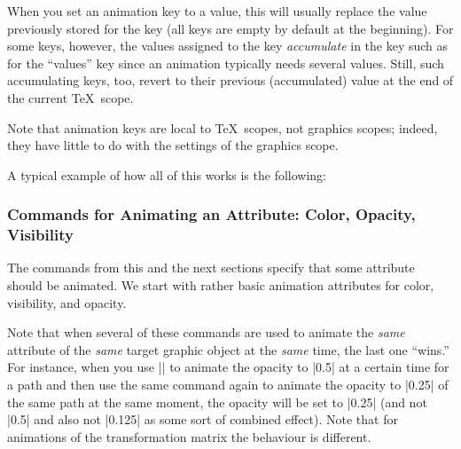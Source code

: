 \begin{enumerate}
  When you set an animation key to a value, this will usually replace
  the value previously stored for the key (all keys are empty by
  default at the beginning). For some keys, however, the values
  assigned to the key \emph{accumulate} in the key such as for the
  ``values'' key since an animation typically needs several
  values. Still, such accumulating keys, too, revert to their previous
  (accumulated) value at the end of the current \TeX\ scope. 

  Note that animation keys are local to \TeX\ scopes, not graphics
  scopes; indeed, they have little to do with the settings of the
  graphics scope. 
\end{enumerate}

A typical example of how all of this works is the following:
\begin{codeexample}
{
  \pgfsys@animation@whom{\someid}{}%
  \pgfsys@animatefillopacity%
}
{
  \pgfsys@animation@whom{\someid}{}%
  \pgfsys@animatelinewidth%
}
\end{codeexample}



\subsubsection{Commands for Animating an Attribute: Color, Opacity, Visibility}

The commands from this and the next sections specify that some
attribute should be animated. We start with rather basic animation
attributes for color, visibility, and opacity.

Note that when several of these commands are used to animate the
\emph{same} attribute of the \emph{same} target graphic object at the
\emph{same} time, the last one ``wins.'' For instance, when you use
|\pgfsys@animateopacity| to animate the opacity to |0.5| at a certain
time for a path and then use the same command again to animate the
opacity to |0.25| of the same path at the same moment, the opacity
will be set to |0.25| (and not |0.5| and also not |0.125| as some sort
of combined effect). Note that for animations of the transformation
matrix the behaviour is different. 

